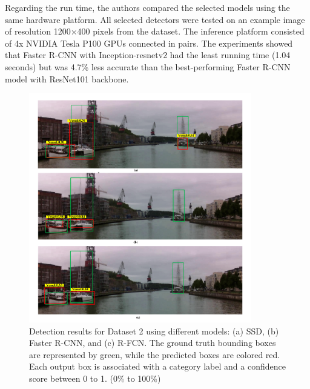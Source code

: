 Regarding the run time, the authors compared the selected models using the same hardware platform. All selected detectors were tested on an example image of resolution 1200×400 pixels from the dataset. The inference platform consisted of 4x NVIDIA Tesla P100 GPUs connected in pairs. The experiments showed that Faster R-CNN with Inception-resnetv2 had the least running time (1.04 seconds) but was 4.7\% less accurate than the best-performing Faster R-CNN model with ResNet101 backbone. 
\begin{figure}[H]
    \centering
    \includegraphics[width=\textwidth,height=10cm,keepaspectratio=true]{src/Images/solv_res_1.PNG}
    \caption{
     Detection results for Dataset 2 using different models: (a) SSD, (b) Faster R-CNN, and (c) R-FCN. The ground truth bounding boxes are represented by green, while the predicted boxes are colored red. Each output box is associated with a category label and a confidence score between 0 to 1. (0\% to 100\%)\cite{soloviev2020comparing}
     }
\end{figure}
\\

